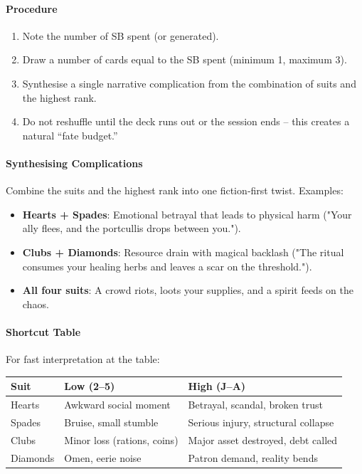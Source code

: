 \paragraph{Procedure}
\begin{enumerate}
  \item Note the number of SB spent (or generated).
  \item Draw a number of cards equal to the SB spent (minimum 1, maximum 3).
  \item Synthesise a single narrative complication from the combination of suits and the highest rank.
  \item Do not reshuffle until the deck runs out or the session ends – this creates a natural “fate budget.”
\end{enumerate}

\paragraph{Synthesising Complications}
Combine the suits and the highest rank into one fiction‑first twist. Examples:
\begin{itemize}
  \item \textbf{Hearts + Spades}: Emotional betrayal that leads to physical harm ("Your ally flees, and the portcullis drops between you.").
  \item \textbf{Clubs + Diamonds}: Resource drain with magical backlash ("The ritual consumes your healing herbs and leaves a scar on the threshold.").
  \item \textbf{All four suits}: A crowd riots, loots your supplies, and a spirit feeds on the chaos.
\end{itemize}

\paragraph{Shortcut Table}
For fast interpretation at the table:

\begin{center}
\begin{tabular}{lll}
\toprule
\textbf{Suit} & \textbf{Low (2–5)} & \textbf{High (J–A)} \\
\midrule
Hearts   & Awkward social moment & Betrayal, scandal, broken trust \\
Spades   & Bruise, small stumble & Serious injury, structural collapse \\
Clubs    & Minor loss (rations, coins) & Major asset destroyed, debt called \\
Diamonds & Omen, eerie noise & Patron demand, reality bends \\
\bottomrule
\end{tabular}
\end{center}

